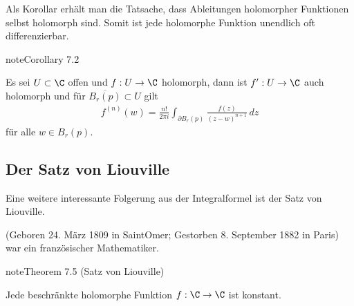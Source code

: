 \documentclass[letterpaper,10pt,german]{jupyterBook}
\begin{document}
\sphinxAtStartPar
Als Korollar erhält man die Tatsache, dass Ableitungen holomorpher Funktionen selbst holomorph sind. Somit ist jede holomorphe Funktion unendlich oft differenzierbar.
\label{complexanalysis/cauchyintegral:cor:infholo}
\begin{sphinxadmonition}{note}{Corollary 7.2}



\sphinxAtStartPar
Es sei \(U\subset\C\) offen und \(f:U\to\C\) holomorph, dann ist \(f^\prime:U\to\C\) auch holomorph und für \(\overline{B_r(p)}\subset U\) gilt
\begin{equation*}
\begin{split}f^{(n)}(w) = \frac{n!}{2\pi i} \int_{\partial B_r(p)} \frac{f(z)}{(z-w)^{n+1}}\, dz\end{split}
\end{equation*}
\sphinxAtStartPar
für alle \(w\in B_r(p)\).
\end{sphinxadmonition}


\subsection{Der Satz von Liouville}
\label{\detokenize{complexanalysis/cauchyintegral:der-satz-von-liouville}}
\sphinxAtStartPar
Eine weitere interessante Folgerung aus der Integralformel ist der Satz von Liouville.

\begin{sphinxShadowBox}

\sphinxAtStartPar
{} (Geboren 24. März 1809 in Saint\sphinxhyphen{}Omer; Gestorben 8. September 1882 in Paris) war ein französischer Mathematiker.
\end{sphinxShadowBox}
\label{complexanalysis/cauchyintegral:theorem-10}
\begin{sphinxadmonition}{note}{Theorem 7.5 (Satz von Liouville)}



\sphinxAtStartPar
Jede beschränkte holomorphe Funktion \(f:\C\to\C\) ist konstant.
\end{sphinxadmonition}
\end{document}
